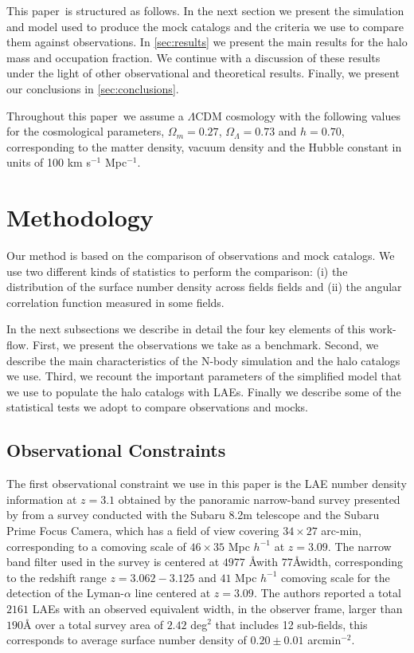 \documentclass[usenatbib]{mn2e}
\newcommand{\documentname}{paper~}
\begin{document}
This \documentname is structured as follows. In the next section we present
the simulation and model used to produce the mock catalogs and the criteria
we use to compare them against observations. In \SS \ref{sec:results} we
present the main results for the halo mass and occupation fraction. We
continue with a discussion of these results under the light of other
observational and theoretical results. Finally, we present our
conclusions in \SS
\ref{sec:conclusions}. 

Throughout this \documentname we assume a $\Lambda$CDM cosmology with the
following values for the cosmological parameters, $\Omega_{m}=0.27$,
$\Omega_{\Lambda}=0.73$ and $h=0.70$, corresponding to the matter
density, vacuum density and the Hubble constant in units of 100 km
s$^{-1}$ Mpc$^{-1}$. 

\section{Methodology}


Our method is based on the comparison of observations and mock
catalogs. We use two different kinds of statistics to perform the
comparison: (i) the distribution of the surface number density
across fields fields and (ii) the angular correlation function measured in
some fields.

In the next subsections we describe in detail the four key
elements of this work-flow. First, we present the observations we take
as a benchmark. Second, we describe the main characteristics of the
N-body simulation and the halo catalogs we use. Third, we recount the
important parameters of the simplified model that we use to populate
the halo catalogs with LAEs. Finally we describe some of the
statistical tests we adopt to compare observations and mocks.

\subsection{Observational Constraints}

The first observational constraint we use in this paper is the LAE number
density information at $z=3.1$ obtained by the panoramic narrow-band
survey presented by \cite{Yamada2012} from a survey
conducted with the Subaru 8.2m telescope and the Subaru Prime Focus Camera,
which has a field of view covering $34\times 27$ arc-min, corresponding to a
comoving scale of $46\times35$ Mpc $h^{-1}$ at $z=3.09$.  The narrow
band filter used in the survey is centered at $4977$ \AA with  $77$\AA width,
corresponding to the redshift range $z=3.062-3.125$ and $41$ Mpc
$h^{-1}$ comoving scale for the detection of the Lyman-$\alpha$ line
centered at $z=3.09$. The authors reported a
total  $2161$  LAEs with an observed equivalent width, in the observer
frame, larger than $190$\AA 
over a total survey area of $2.42$ deg$^{2}$ that includes 12 sub-fields, 
this corresponds to average surface number density of $0.20\pm 0.01$
arcmin$^{-2}$.    
\end{document}

